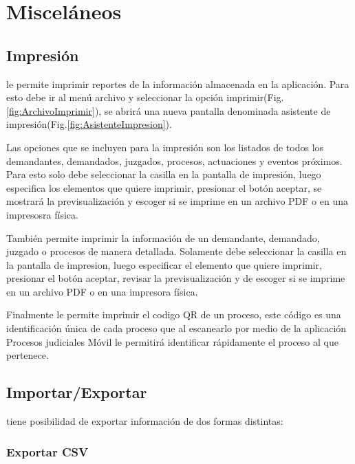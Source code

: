 \chapter{Miscel\'aneos}
\label{sec:miscelaneo}

\section{Impresi\'on}

\softwareAbogadosDesktop le permite imprimir reportes de la informaci\'on almacenada en la aplicaci\'on. Para esto debe ir al men\'u archivo y seleccionar la opci\'on imprimir(Fig.\ref{fig:ArchivoImprimir}), se abrir\'a una nueva pantalla denominada asistente de impresi\'on(Fig.\ref{fig:AsistenteImpresion}). 
  

Las opciones que se incluyen para la impresi\'on son los listados de todos los  demandantes, demandados, juzgados, procesos, actuaciones y eventos pr\'oximos. Para esto solo debe seleccionar la casilla en la pantalla de impresi\'on, luego especifica los elementos que quiere imprimir, presionar el bot\'on aceptar, se mostrar\'a la previsualizaci\'on y escoger si se imprime en un archivo PDF o en una impresosra f\'isica.
 
Tambi\'en permite imprimir la informaci\'on de un demandante, demandado, juzgado o procesos de manera detallada. Solamente debe seleccionar la casilla en la pantalla de impresion, luego especificar el elemento que quiere imprimir, presionar el bot\'on aceptar, revisar la previsualizaci\'on y de escoger si se imprime en un archivo PDF o en una impresora f\'isica.
 
Finalmente le permite imprimir el codigo QR de un proceso, este c\'odigo es una identificaci\'on \'unica de cada proceso que al escanearlo por medio de la aplicaci\'on Procesos judiciales M\'ovil le permitir\'a identificar r\'apidamente el proceso al que pertenece.

\section{Importar/Exportar}

\softwareAbogadosDesktop tiene posibilidad de exportar informaci\'on de dos formas distintas:

\subsection{Exportar CSV}

